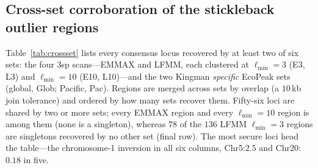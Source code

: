 \documentclass[11pt]{article}
\begin{document}
\subsection{Cross-set corroboration of the stickleback outlier regions}
\label{sec:supp-crossset}

Table~\ref{tab:crossset} lists every consensus locus recovered by at least two of
six sets: the four 3sp scans---EMMAX and LFMM, each clustered at $\ell_{\min}=3$
(E3, L3) and $\ell_{\min}=10$ (E10, L10)---and the two Kingman \emph{specific}
EcoPeak sets (global, Glob; Pacific, Pac). Regions are merged across sets by overlap
(a $10$\,kb join tolerance) and ordered by how many sets recover them. Fifty-six
loci are shared by two or more sets; every EMMAX region and every $\ell_{\min}=10$
region is among them (none is a singleton), whereas $78$ of the $136$ LFMM
$\ell_{\min}=3$ regions are singletons recovered by no other set (final row). The
most secure loci head the table---the chromosome-1 inversion in all six columns,
Chr5:$2.5$ and Chr20:$0.18$ in five.
\end{document}

